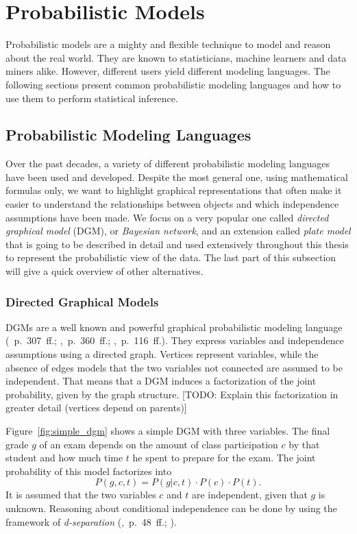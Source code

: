 \section{Probabilistic Models}

Probabilistic models are a mighty and flexible technique to model and reason about the real world. They are known to statisticians, machine learners and data miners alike. However, different users yield different modeling languages. The following sections present common probabilistic modeling languages and how to use them to perform statistical inference.

\subsection{Probabilistic Modeling Languages}

Over the past decades, a variety of different probabilistic modeling languages have been used and developed. Despite the most general one, using mathematical formulas only, we want to highlight graphical representations that often make it easier to understand the relationships between objects and which independence assumptions have been made. We focus on a very popular one called \emph{directed graphical model} (DGM), or \emph{Bayesian network}, and an extension called \emph{plate model} that is going to be described in detail and used extensively throughout this thesis to represent the probabilistic view of the data. The last part of this subsection will give a quick overview of other alternatives.

\subsubsection{Directed Graphical Models}

DGMs are a well known and powerful graphical probabilistic modeling language (\cite{murphy2012machine}~p.~307~ff.; \cite{bishop2006pattern},~p.~360~ff.; \cite{pearl1988probabilistic},~p.~116~ff.). They express variables and independence assumptions using a directed graph. Vertices represent variables, while the absence of edges models that the two variables not connected are assumed to be independent. That means that a DGM induces a factorization of the joint probability, given by the graph structure. [TODO: Explain this factorization in greater detail (vertices depend on parents)]

Figure~\ref{fig:simple_dgm} shows a simple DGM with three variables. The final grade $g$ of an exam depends on the amount of class participation $c$ by that student and how much time $t$ he spent to prepare for the exam. The joint probability of this model factorizes into $$P(g,c,t) = P(g | c, t) \cdot P(c) \cdot P(t).$$ It is assumed that the two variables $c$ and $t$ are independent, given that $g$ is unknown. Reasoning about conditional independence can be done by using the framework of \emph{d-separation}  (\cite{lauritzen1996graphical},~p.~48~ff.; \cite{pearl1988probabilistic}).

